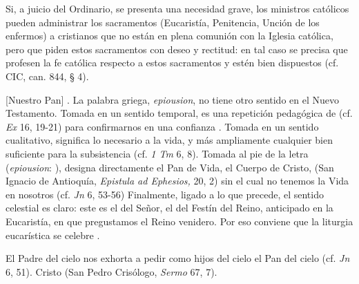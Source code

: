 \begin{ccebody}
 Si, a juicio del Ordinario, se presenta una necesidad grave, los ministros católicos pueden administrar los sacramentos (Eucaristía, Penitencia, Unción de los enfermos) a cristianos que no están en plena comunión con la Iglesia católica, pero que piden estos sacramentos con deseo y rectitud: en tal caso se precisa que profesen la fe católica respecto a estos sacramentos y estén bien dispuestos (cf. CIC, can. 844, § 4).

 [Nuestro Pan] . La palabra griega, \textit{epiousion}, no tiene otro sentido en el Nuevo Testamento. Tomada en un sentido temporal, es una repetición pedagógica de  (cf. \textit{Ex} 16, 19-21) para confirmarnos en una confianza . Tomada en un sentido cualitativo, significa lo necesario a la vida, y más ampliamente cualquier bien suficiente para la subsistencia (cf. \textit{1 Tm} 6, 8). Tomada al pie de la letra (\textit{epiousion}: ), designa directamente el Pan de Vida, el Cuerpo de Cristo,  (San Ignacio de Antioquía, \textit{Epistula ad Ephesios,} 20, 2) sin el cual no tenemos la Vida en nosotros (cf. \textit{Jn} 6, 53-56) Finalmente, ligado a lo que precede, el sentido celestial es claro: este  es el del Señor, el del Festín del Reino, anticipado en la Eucaristía, en que pregustamos el Reino venidero. Por eso conviene que la liturgia eucarística se celebre .


El Padre del cielo nos exhorta a pedir como hijos del cielo el Pan del cielo (cf. \textit{Jn} 6, 51). Cristo  (San Pedro Crisólogo, \textit{Sermo} 67, 7).
\end{ccebody}


\newpage
{}

